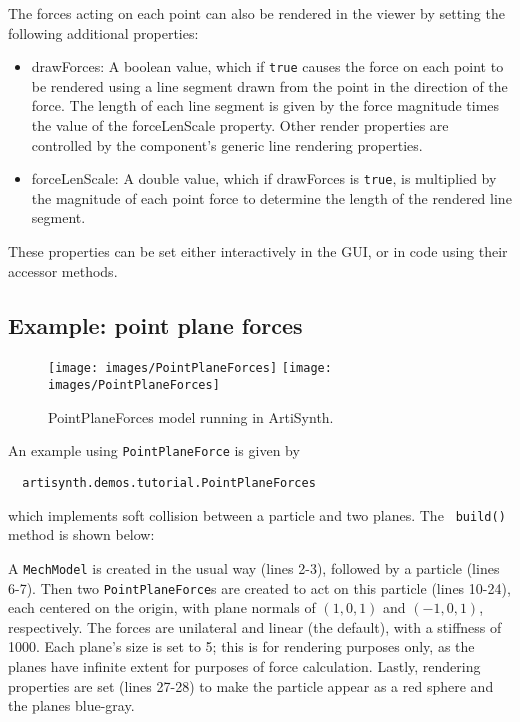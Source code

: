 The forces acting on each point can also be rendered in the viewer by setting
the following additional properties:

\begin{itemize}

\item {\sf drawForces}: A boolean value, which if {\tt true}
causes the force on each point to be rendered using a line segment drawn from
the point in the direction of the force. The length of each line segment is
given by the force magnitude times the value of the {\sf forceLenScale}
property. Other render properties are controlled by the component's generic
line rendering properties.

\item {\sf forceLenScale}: A double value, which if {\sf drawForces} is 
{\tt true}, is multiplied by the magnitude of each point force to determine the
length of the rendered line segment.

\end{itemize}

These properties can be set either interactively in the GUI, or in code using
their accessor methods.

\subsection{Example: point plane forces}

\begin{figure}[h]
\begin{center}
\iflatexml
 \texttt{[image: images/PointPlaneForces]}
\else
 \texttt{[image: images/PointPlaneForces]}
\fi
\end{center}
\caption{PointPlaneForces model running in ArtiSynth.}
\label{PointPlaneForces:fig}
\end{figure}

An example using {\tt PointPlaneForce} is given by
%
\begin{verbatim}
  artisynth.demos.tutorial.PointPlaneForces
\end{verbatim}
%
which implements soft collision between a particle and two planes.  The {\tt
build()} method is shown below:
%
\lstset{numbers=left}
\iflatexml

\else

\fi
\lstset{numbers=none}
%
A {\tt MechModel} is created in the usual way (lines 2-3), followed by a
particle (lines 6-7). Then two {\tt PointPlaneForce}s are created to act on
this particle (lines 10-24), each centered on the origin, with plane normals of
$(1, 0, 1)$ and $(-1, 0, 1)$, respectively. The forces are unilateral and
linear (the default), with a stiffness of 1000. Each plane's size is set to 5;
this is for rendering purposes only, as the planes have infinite extent for
purposes of force calculation. Lastly, rendering properties are set (lines
27-28) to make the particle appear as a red sphere and the planes blue-gray.

